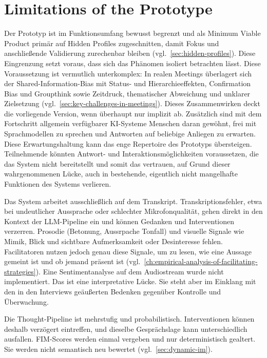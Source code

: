 \section{Limitations of the Prototype}
\label{sec:limitations-of-prototype}

Der Prototyp ist im Funktionsumfang bewusst begrenzt und als Minimum Viable Product primär auf
Hidden Profiles zugeschnitten, damit Fokus und anschließende Validierung zurechenbar bleiben
(vgl.\ \autoref{sec:hidden-profiles}).
Diese Eingrenzung setzt voraus, dass sich das Phänomen isoliert betrachten lässt. Diese Voraussetzung
ist vermutlich unterkomplex: In realen Meetings überlagert sich der Shared-Information-Bias mit Status- und
Hierarchieeffekten, Confirmation Bias und Groupthink sowie Zeitdruck, thematischer Abweichung und
unklarer Zielsetzung (vgl.\ \autoref{sec:key-challenges-in-meetings}).
Dieses Zusammenwirken deckt die vorliegende Version, wenn überhaupt nur implizit ab.
Zusätzlich sind mit dem Fortschritt allgemein verfügbarer KI-Systeme Menschen daran gewöhnt, frei mit
Sprachmodellen zu sprechen und Antworten auf beliebige Anliegen zu erwarten.
Diese Erwartungshaltung kann das enge Repertoire des Prototyps übersteigen. Teilnehmende
könnten Antwort- und Interaktionsmöglichkeiten voraussetzen, die das System nicht bereitstellt und somit das
vertrauen, auf Grund dieser wahrgenommenen Lücke, auch in bestehende, eigentlich nicht mangelhafte Funktionen des
Systems verlieren.

Das System arbeitet ausschließlich auf dem Transkript.
Transkriptionsfehler, etwa bei undeutlicher Aussprache oder schlechter Mikrofonqualität, gehen direkt
in den Kontext der LLM-Pipeline ein und können Gedanken und Interventionen verzerren.
Prosodie (Betonung, Aussrpache Tonfall) und visuelle Signale wie Mimik, Blick und sichtbare Aufmerksamkeit
oder Desinteresse fehlen.
Facilitatoren nutzen jedoch genau diese Signale, um zu lesen, wie eine Aussage gemeint ist und ob jemand
präsent ist (vgl.\ \autoref{ch:empirical-analysis-of-facilitating-strategies}).
Eine Sentimentanalyse auf dem Audiostream wurde nicht implementiert.
Das ist eine interpretative Lücke. Sie steht aber im Einklang mit den in den Interviews geäußerten
Bedenken gegenüber Kontrolle und Überwachung.

Die Thought-Pipeline ist mehrstufig und probabilistisch. Interventionen können deshalb verzögert
eintreffen, und dieselbe Gesprächslage kann unterschiedlich ausfallen.
FIM-Scores werden einmal vergeben und nur deterministisch gealtert. Sie werden nicht semantisch neu
bewertet (vgl.\ \autoref{sec:dynamic-im}).


